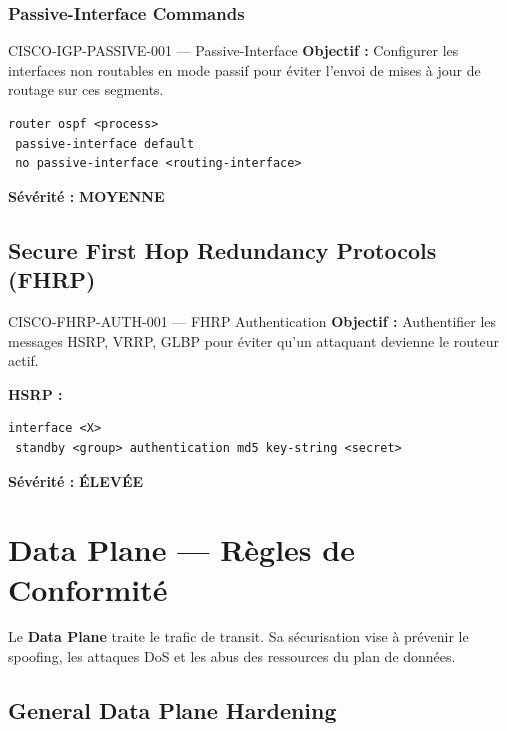 \documentclass[12pt, a4paper]{report}
\begin{document}
\subsection{Passive-Interface Commands}

\begin{rulebox}{CISCO-IGP-PASSIVE-001 — Passive-Interface}
  \textbf{Objectif :} Configurer les interfaces non routables en mode passif pour éviter l'envoi de mises à jour de routage sur ces segments.

  \begin{lstlisting}
router ospf <process>
 passive-interface default
 no passive-interface <routing-interface>
  \end{lstlisting}

  \textbf{Sévérité :} \textcolor{accentGreen}{\textbf{MOYENNE}}
\end{rulebox}

\section{Secure First Hop Redundancy Protocols (FHRP)}

\begin{rulebox}{CISCO-FHRP-AUTH-001 — FHRP Authentication}
  \textbf{Objectif :} Authentifier les messages HSRP, VRRP, GLBP pour éviter qu'un attaquant devienne le routeur actif.

  \textbf{HSRP :}
  \begin{lstlisting}
interface <X>
 standby <group> authentication md5 key-string <secret>
  \end{lstlisting}

  \textbf{Sévérité :} \textcolor{accentOrange}{\textbf{ÉLEVÉE}}
\end{rulebox}

\chapter{Data Plane — Règles de Conformité}

Le \textbf{Data Plane} traite le trafic de transit. Sa sécurisation vise à prévenir le spoofing, les attaques DoS et les abus des ressources du plan de données.

\section{General Data Plane Hardening}
\end{document}
